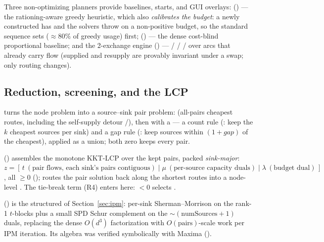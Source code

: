 Three non-optimizing planners provide baselines, starts, and GUI overlays:
 () --- the rationing-aware greedy
heuristic, which also \emph{calibrates the budget}: a newly constructed
 has  and the solvers throw on a
non-positive budget, so the standard sequence sets  ($\approx 80\%$ of greedy usage) first;
 () --- the dense cost-blind
proportional baseline; and the 2-exchange engine () ---
 /  /  /
 over arcs that already carry flow (supplied and
resupply are provably invariant under a swap; only routing changes).

\subsection{Reduction, screening, and the LCP}

 turns the node problem into a source--sink pair
problem:  (all-pairs cheapest routes, including
the self-supply detour /), then
 with a  --- a count rule
(: keep the $k$ cheapest sources per sink) and a gap
rule (: keep sources within $(1+\mathit{gap})$ of the
cheapest), applied as a union; both zero keeps every pair.

 () assembles the monotone KKT-LCP over
the kept pairs, packed \emph{sink-major}: $z = [\,t\ (\text{pair flows, each
sink's pairs contiguous}) \mid \mu\ (\text{per-source capacity duals}) \mid
\lambda\ (\text{budget dual})\,]$, all $\ge 0$ ();
 routes the pair solution back along the shortest routes
into a node-level . The tie-break term (R4) enters here:
 $< 0$ selects .

 () is the structured
 of Section~\ref{sec:ipm}: per-sink
Sherman--Morrison on the rank-1 $t$-blocks plus a small SPD Schur complement
on the $\sim(\text{numSources}+1)$ duals, replacing the dense $O(d^3)$
factorization with $O(\text{pairs})$-scale work per IPM iteration. Its
algebra was verified symbolically with Maxima \cite{maxima}
().

